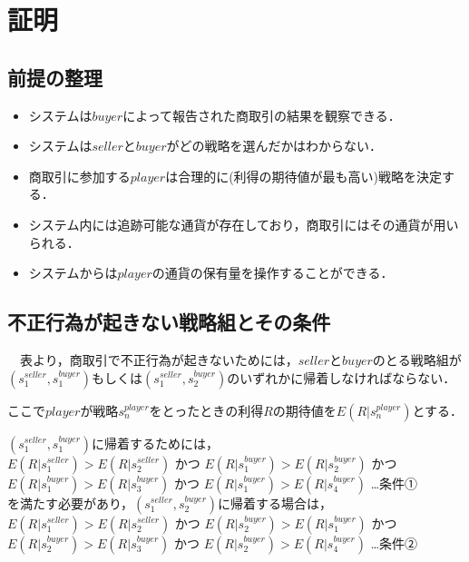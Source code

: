 \section{証明}
\subsection{前提の整理}
  \begin{itemize}
    \item システムは$buyer$によって報告された商取引の結果を観察できる．
    \item システムは$seller$と$buyer$がどの戦略を選んだかはわからない．
    \item 商取引に参加する$player$は合理的に(利得の期待値が最も高い)戦略を決定する．
    \item システム内には追跡可能な通貨が存在しており，商取引にはその通貨が用いられる．
    \item システムからは$player$の通貨の保有量を操作することができる．
  \end{itemize}

\subsection{不正行為が起きない戦略組とその条件}
　表より，商取引で不正行為が起きないためには，$seller$と$buyer$のとる戦略組が$ (s^{seller}_1, s^{buyer}_1)$もしくは$(s^{seller}_1, s^{buyer}_2)$のいずれかに帰着しなければならない．

  ここで$player$が戦略$s^{player}_n$をとったときの利得$R$の期待値を$E(R|s^{player}_n)$とする．

  $(s^{seller}_1, s^{buyer}_1)$に帰着するためには，\\

  $E(R|s^{seller}_1)>E(R|s^{seller}_2)$
  かつ
  $E(R|s^{buyer}_1)>E(R|s^{buyer}_2)$
  かつ
  $E(R|s^{buyer}_1)>E(R|s^{buyer}_3)$
  かつ
  $E(R|s^{buyer}_1)>E(R|s^{buyer}_4)$ …条件①\\

  を満たす必要があり，$(s^{seller}_1, s^{buyer}_2)$に帰着する場合は，\\

  $E(R|s^{seller}_1)>E(R|s^{seller}_2)$
  かつ
  $E(R|s^{buyer}_2)>E(R|s^{buyer}_1)$
  かつ
  $E(R|s^{buyer}_2) > E(R|s^{buyer}_3)$
  かつ
  $E(R|s^{buyer}_2) > E(R|s^{buyer}_4)$ …条件②\\

